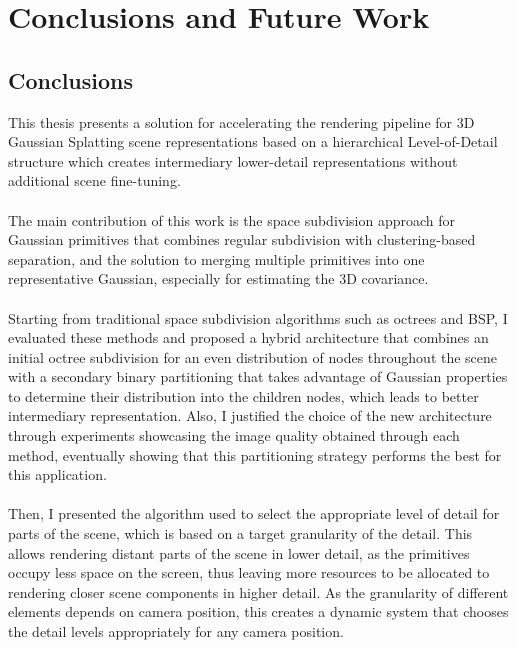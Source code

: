 \section{Conclusions and Future Work}
\subsection{Conclusions}
This thesis presents a solution for accelerating the rendering pipeline for 3D Gaussian Splatting scene representations based on a hierarchical Level-of-Detail structure which creates intermediary lower-detail representations without additional scene fine-tuning.
\paragraph{}

The main contribution of this work is the space subdivision approach for Gaussian primitives that combines regular subdivision with clustering-based separation, and the solution to merging multiple primitives into one representative Gaussian, especially for estimating the 3D covariance. 
\paragraph{}

Starting from traditional space subdivision algorithms such as octrees and BSP, I evaluated these methods and proposed a hybrid architecture that combines an initial octree subdivision for an even distribution of nodes throughout the scene with a secondary binary partitioning that takes advantage of Gaussian properties to determine their distribution into the children nodes, which leads to better intermediary representation. Also, I justified the choice of the new architecture through experiments showcasing the image quality obtained through each method, eventually showing that this partitioning strategy performs the best for this application.
\paragraph{}

Then, I presented the algorithm used to select the appropriate level of detail for parts of the scene, which is based on a target granularity of the detail. This allows rendering distant parts of the scene in lower detail, as the primitives occupy less space on the screen, thus leaving more resources to be allocated to rendering closer scene components in higher detail. As the granularity of different elements depends on camera position, this creates a dynamic system that chooses the detail levels appropriately for any camera position.

